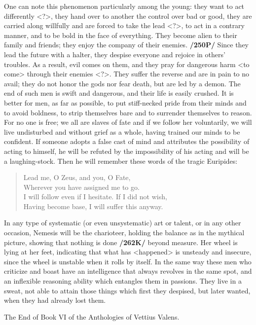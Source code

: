 One can note this phenomenon particularly among the young: they want to act differently <?>, they hand over to another the control over bad or good, they are carried along willfully and are forced to take the lead <?>, to act in a contrary manner, and to be bold in the face of everything. They become alien to their family and friends; they enjoy the company of their enemies. \textbf{/250P/} Since they lead the future with a halter, they despise everyone and rejoice in others’ troubles. As a result, evil comes on them, and they pray for dangerous harm <to come> through their enemies <?>. They suffer the reverse and are in pain to no avail; they do not honor the gods nor fear death, but are led by a demon. The end of such men is swift and
dangerous, and their life is easily crushed.  It is better for men, as far as possible, to put stiff-necked pride from their minds and to avoid boldness, to strip themselves bare and to surrender themselves to reason. For no one is free; we all are slaves of fate and if we follow her voluntarily, we will live undisturbed and without grief as a whole, having trained our minds to be confident. If someone adopts a false cast of mind and attributes the possibility of acting to himself, he will be refuted by the impossibility of his acting and will be a laughing-stock. Then he will remember these words of the tragic Euripides:

\begin{verse}
Lead me, O Zeus, and you, O Fate, \\
Wherever you have assigned me to go.\\
I will follow even if I hesitate. If I did not wish, \\
Having become base, I will suffer this anyway. \\
\end{verse}

In any type of systematic (or even unsystematic) art or talent, or in any other occasion, Nemesis will be the charioteer, holding the balance as in the mythical picture, showing that nothing is done \textbf{/262K/}
beyond measure. Her wheel is lying at her feet, indicating that what has <happened> is unsteady and insecure, since the wheel is unstable when it rolls by itself. In the same way these men who criticize and boast have an intelligence that always revolves in the same spot, and an inflexible reasoning ability which entangles them in passions. They live in a sweat, not able to attain those things which first they despised, but later wanted, when they had already lost them.

The End of Book VI of the Anthologies of Vettius Valens.

\newpage